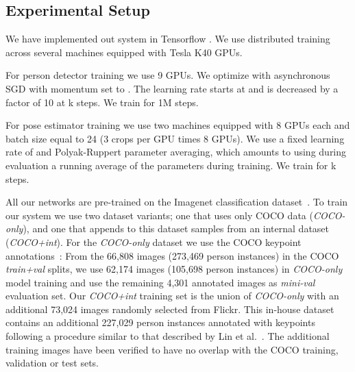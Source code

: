 \documentclass[10pt,twocolumn,letterpaper]{article}
\begin{document}
\begin{table*}
\centering
\caption{Performance on COCO keypoint \textbf{test-standard} split.}
\label{table:coco_results_teststandard}
\end{table*}

\subsection{Experimental Setup}
\label{sec:experimental_setup}

We have implemented out system in Tensorflow \cite{tensorflow2015-whitepaper}. We use distributed training across several machines equipped with Tesla K40 GPUs.

For person detector training we use 9 GPUs. We optimize with asynchronous SGD with momentum set to . The learning rate starts at  and is decreased by a factor of 10 at k steps. We train for 1M steps.

For pose estimator training we use two machines equipped with 8 GPUs each and batch size equal to 24 (3 crops per GPU times 8 GPUs). We use a fixed learning rate of  and Polyak-Ruppert parameter averaging, which amounts to using during evaluation a running average of the parameters during training. We train for k steps.

All our networks are pre-trained on the Imagenet classification dataset~\cite{imagenet2015}. To train our system we use two dataset variants; one that uses only COCO data (\emph{COCO-only}), and one that appends to this dataset samples from an internal dataset (\emph{COCO+int}). For the \emph{COCO-only} dataset we use the COCO keypoint annotations~\cite{lin2014microsoft}: From the 66,808 images (273,469 person instances) in the COCO \emph{train+val} splits, we use 62,174 images (105,698 person instances) in \emph{COCO-only} model training and use the remaining 4,301 annotated images as \emph{mini-val} evaluation set. Our \emph{COCO+int} training set is the union of \emph{COCO-only} with an additional 73,024 images randomly selected from Flickr. This in-house dataset contains an additional 227,029 person instances annotated with keypoints following a procedure similar to that described by Lin et al.~\cite{keypointchallenge}. The additional training images have been verified to have no overlap with the COCO training, validation or test sets.
\end{document}

